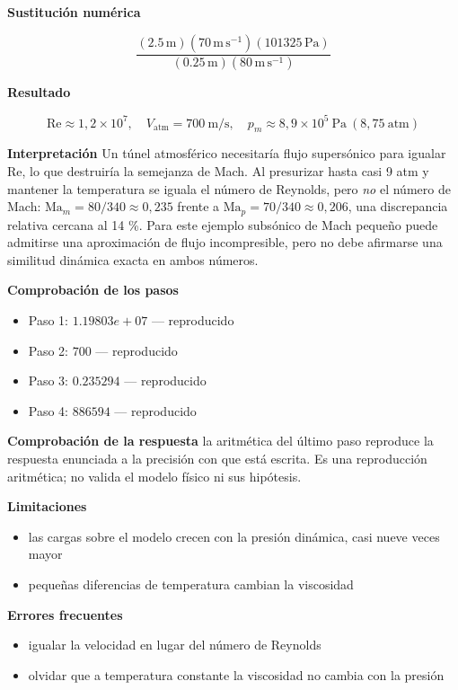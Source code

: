 \documentclass[10pt,openany]{book}
\begin{document}
\begin{tcolorbox}[title={Problema resuelto}, studiumworked, breakable]
\noindent\textbf{Sustitución numérica}

\[
\frac{\left(2.5\,\mathrm{m}\right) \left(70\,\mathrm{m}\,\mathrm{s}^{-1}\right) \left(101325\,\mathrm{Pa}\right)}{\left(0.25\,\mathrm{m}\right) \left(80\,\mathrm{m}\,\mathrm{s}^{-1}\right)}
\]

\noindent\textbf{Resultado}

\[
\mathrm{Re} \approx 1{,}2\times 10^{7},\quad V_{\mathrm{atm}} = 700\ \mathrm{m/s},\quad p_m \approx 8{,}9\times 10^{5}\ \mathrm{Pa}\ (8{,}75\ \mathrm{atm})
\]

\noindent\textbf{Interpretación}
Un túnel atmosférico necesitaría flujo supersónico para igualar \(\mathrm{Re}\), lo que destruiría la semejanza de Mach. Al presurizar hasta casi 9 atm y mantener la temperatura se iguala el número de Reynolds, pero \emph{no} el número de Mach: \(\mathrm{Ma}_m=80/340\approx0{,}235\) frente a \(\mathrm{Ma}_p=70/340\approx0{,}206\), una discrepancia relativa cercana al 14 \%. Para este ejemplo subsónico de Mach pequeño puede admitirse una aproximación de flujo incompresible, pero no debe afirmarse una similitud dinámica exacta en ambos números.

\noindent\textbf{Comprobación de los pasos}
\begin{itemize}
\item Paso 1: $1.19803e+07$ — reproducido
\item Paso 2: $700$ — reproducido
\item Paso 3: $0.235294$ — reproducido
\item Paso 4: $886594$ — reproducido
\end{itemize}

\noindent\textbf{Comprobación de la respuesta} la aritmética del último paso reproduce la respuesta enunciada a la precisión con que está escrita. Es una reproducción aritmética; no valida el modelo físico ni sus hipótesis.

\noindent\textbf{Limitaciones}
\begin{itemize}
\item las cargas sobre el modelo crecen con la presión dinámica, casi nueve veces mayor
\item pequeñas diferencias de temperatura cambian la viscosidad
\end{itemize}

\noindent\textbf{Errores frecuentes}
\begin{itemize}
\item igualar la velocidad en lugar del número de Reynolds
\item olvidar que a temperatura constante la viscosidad no cambia con la presión
\end{itemize}
\end{tcolorbox}
\end{document}
